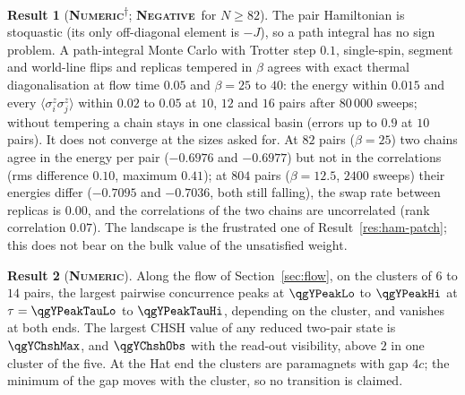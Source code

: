 \documentclass[11pt]{article}
\newcommand{\numeric}{\textbf{\textsc{Numeric}}}
\newcommand{\negres}{\textbf{\textsc{Negative}}}
\newcommand{\snap}{\textsuperscript{$\dagger$}}      %
\theoremstyle{definition}
\newtheorem{result}{Result}
\begin{document}
\begin{result}[\numeric\snap; \negres\ for $N\ge82$]\label{res:qmc}
The pair Hamiltonian is stoquastic (its only off-diagonal element is $-J$), so a path integral has no sign problem. A path-integral Monte Carlo with Trotter step $0.1$, single-spin, segment and world-line flips and replicas tempered in $\beta$ agrees with exact thermal diagonalisation at flow time $0.05$ and $\beta=25$ to $40$: the energy within $0.015$ and every $\langle\sigma^z_i\sigma^z_j\rangle$ within $0.02$ to $0.05$ at $10$, $12$ and $16$ pairs after $80\,000$ sweeps; without tempering a chain stays in one classical basin (errors up to $0.9$ at $10$ pairs). It does not converge at the sizes asked for. At $82$ pairs ($\beta=25$) two chains agree in the energy per pair ($-0.6976$ and $-0.6977$) but not in the correlations (rms difference $0.10$, maximum $0.41$); at $804$ pairs ($\beta=12.5$, $2400$ sweeps) their energies differ ($-0.7095$ and $-0.7036$, both still falling), the swap rate between replicas is $0.00$, and the correlations of the two chains are uncorrelated (rank correlation $0.07$). The landscape is the frustrated one of Result~\ref{res:ham-patch}; this does not bear on the bulk value of the unsatisfied weight.
\end{result}
\begin{result}[\numeric]\label{res:ham-flow}
Along the flow of Section~\ref{sec:flow}, on the clusters of $6$ to $14$ pairs, the largest pairwise concurrence peaks at $\qgYPeakLo$ to $\qgYPeakHi$ at $\tau=\qgYPeakTauLo$ to $\qgYPeakTauHi$, depending on the cluster, and vanishes at both ends. The largest CHSH value of any reduced two-pair state is $\qgYChshMax$, and $\qgYChshObs$ with the read-out visibility, above $2$ in one cluster of the five. At the Hat end the clusters are paramagnets with gap $4c$; the minimum of the gap moves with the cluster, so no transition is claimed.
\end{result}
\end{document}

